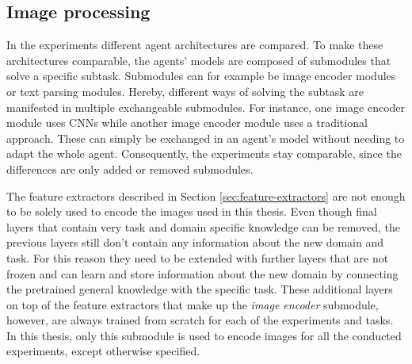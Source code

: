 
\subsection{Image processing}
\label{sec:image-processing}
In the experiments different agent architectures are compared.
To make these architectures comparable, the agents' models are composed of submodules that solve a specific subtask.
Submodules can for example be image encoder modules or text parsing modules.
Hereby, different ways of solving the subtask are manifested in multiple exchangeable submodules.
For instance, one image encoder module uses CNNs while another image encoder module uses a traditional approach.
These can simply be exchanged in an agent's model without needing to adapt the whole agent.
Consequently, the experiments stay comparable, since the differences are only added or removed submodules.

The feature extractors described in Section \ref{sec:feature-extractors} are not enough to be solely used to encode the images used in this thesis.
Even though final layers that contain very task and domain specific knowledge can be removed, the previous layers still don't contain any information about the new domain and task.
For this reason they need to be extended with further layers that are not frozen and can learn and store information about the new domain by connecting the pretrained general knowledge with the specific task.
These additional layers on top of the feature extractors that make up the \emph{image encoder} submodule, however, are always trained from scratch for each of the experiments and tasks.
In this thesis, only this submodule is used to encode images for all the conducted experiments, except otherwise specified.

